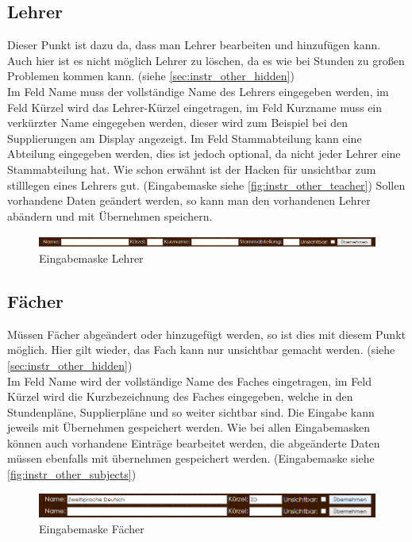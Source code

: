 \subsection{Lehrer}
Dieser Punkt ist dazu da, dass man Lehrer bearbeiten und hinzufügen kann. Auch hier ist es nicht möglich Lehrer zu löschen, da es wie bei Stunden zu großen Problemen kommen kann. (siehe \autoref{sec:instr_other_hidden})\\
Im Feld Name muss der vollständige Name des Lehrers eingegeben werden, im Feld Kürzel wird das Lehrer-Kürzel eingetragen, im Feld Kurzname muss ein verkürzter Name eingegeben werden, dieser wird zum Beispiel bei den Supplierungen am Display angezeigt. Im Feld Stammabteilung kann eine Abteilung eingegeben werden, dies ist jedoch optional, da nicht jeder Lehrer eine Stammabteilung hat. Wie schon erwähnt ist der Hacken für unsichtbar zum stilllegen eines Lehrers gut. (Eingabemaske siehe \autoref{fig:instr_other_teacher}) Sollen vorhandene Daten geändert werden, so kann man den vorhandenen Lehrer abändern und mit Übernehmen speichern.
\begin{figure}[H]
\centering
\includegraphics[keepaspectratio=true, width=17cm]{images/screenshots/teachers_input.png}
\caption{Eingabemaske Lehrer}
\label{fig:instr_other_teacher}
\end{figure}
\subsection{Fächer}
Müssen Fächer abgeändert oder hinzugefügt werden, so ist dies mit diesem Punkt möglich. Hier gilt wieder, das Fach kann nur unsichtbar gemacht werden. (siehe \autoref{sec:instr_other_hidden})\\
Im Feld Name wird der vollständige Name des Faches eingetragen, im Feld Kürzel wird die Kurzbezeichnung des Faches eingegeben, welche in den Stundenpläne, Supplierpläne und so weiter sichtbar sind. Die Eingabe kann jeweils mit Übernehmen gespeichert werden. Wie bei allen Eingabemasken können auch vorhandene Einträge bearbeitet werden, die abgeänderte Daten müssen ebenfalls mit übernehmen gespeichert werden. (Eingabemaske siehe \autoref{fig:instr_other_subjects})
\begin{figure}[H]
\centering
\includegraphics[keepaspectratio=true, width=17cm]{images/screenshots/subjects_input.png}
\caption{Eingabemaske Fächer}
\label{fig:instr_other_subjects}
\end{figure}
